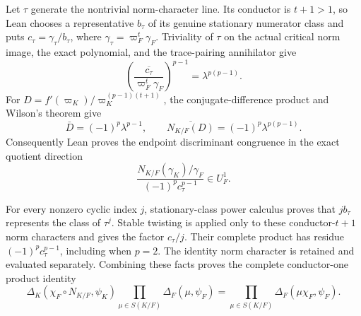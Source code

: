 \begin{theorem}
Let $\tau$ generate the nontrivial norm-character line.  Its conductor is
$t+1>1$, so Lean chooses a representative $b_\tau$ of its genuine
stationary numerator class and puts
$c_\tau=\gamma_\tau/b_\tau$, where
$\gamma_\tau=\varpi_F^t\gamma_F$.  Triviality of $\tau$ on the actual
critical norm image, the exact polynomial, and the trace-pairing
annihilator give
\[
 \left(
   \overline{\frac{c_\tau}{\varpi_F^t\gamma_F}}
 \right)^{p-1}
 =\lambda^{p(p-1)}.
\]
For
$D=f'(\varpi_K)/\varpi_K^{(p-1)(t+1)}$, the conjugate-difference product
and Wilson's theorem give
\[
 \bar D=(-1)^p\lambda^{p-1},
 \qquad
 \overline{N_{K/F}(D)}=(-1)^p\lambda^{p(p-1)}.
\]
Consequently Lean proves the endpoint discriminant congruence in the exact
quotient direction
\[
 \frac{N_{K/F}(\gamma_K)/\gamma_F}
      {(-1)^p c_\tau^{p-1}}
 \in U_F^1.
\]

For every nonzero cyclic index $j$, stationary-class power calculus proves
that $j b_\tau$ represents the class of $\tau^j$.  Stable twisting is
applied only to these conductor-$t+1$ norm characters and gives the factor
$c_\tau/j$.  Their complete product has residue
$(-1)^p c_\tau^{p-1}$, including when $p=2$.  The identity norm character
is retained and evaluated separately.  Combining these facts proves the
complete conductor-one product identity
\[
 \Delta_K(\chi_F\circ N_{K/F},\psi_K)
 \prod_{\mu\in S(K/F)}\Delta_F(\mu,\psi_F)
 =
 \prod_{\mu\in S(K/F)}\Delta_F(\mu\chi_F,\psi_F).
\]


\end{theorem}
